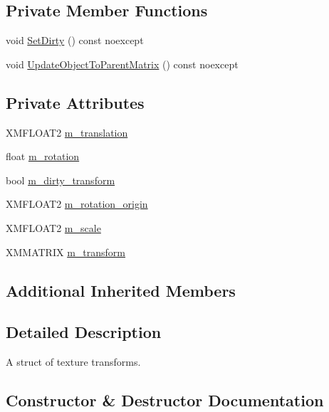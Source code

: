 \subsection*{Private Member Functions}
\begin{DoxyCompactItemize}
\item 
void \hyperlink{structmage_1_1_texture_transform_a471542a6be04f39307dd10ba2bb67ce1}{Set\+Dirty} () const noexcept
\item 
void \hyperlink{structmage_1_1_texture_transform_a9c57bc18eead3ce17265ae9cd3a7a8c7}{Update\+Object\+To\+Parent\+Matrix} () const noexcept
\end{DoxyCompactItemize}
\subsection*{Private Attributes}
\begin{DoxyCompactItemize}
\item 
X\+M\+F\+L\+O\+A\+T2 \hyperlink{structmage_1_1_texture_transform_a6b468f62dc90f84bbf877192ff167c22}{m\+\_\+translation}
\item 
float \hyperlink{structmage_1_1_texture_transform_a8f8127fa0e832efe5923c2cd8157c2c6}{m\+\_\+rotation}
\item 
bool \hyperlink{structmage_1_1_texture_transform_a7d23cd89e4ab16e08a214272d280c5e2}{m\+\_\+dirty\+\_\+transform}
\item 
X\+M\+F\+L\+O\+A\+T2 \hyperlink{structmage_1_1_texture_transform_a6be18aac7ead059bb2ea4b3a464e0272}{m\+\_\+rotation\+\_\+origin}
\item 
X\+M\+F\+L\+O\+A\+T2 \hyperlink{structmage_1_1_texture_transform_a57ecf30158fc8ba715c40742f1afa0bd}{m\+\_\+scale}
\item 
X\+M\+M\+A\+T\+R\+IX \hyperlink{structmage_1_1_texture_transform_ad801f906833544ca476908c241945ed6}{m\+\_\+transform}
\end{DoxyCompactItemize}
\subsection*{Additional Inherited Members}


\subsection{Detailed Description}
A struct of texture transforms. 

\subsection{Constructor \& Destructor Documentation}
\hypertarget{structmage_1_1_texture_transform_a345bc55a1ce23cf5febd583ae9c37702}{}\label{structmage_1_1_texture_transform_a345bc55a1ce23cf5febd583ae9c37702} 
